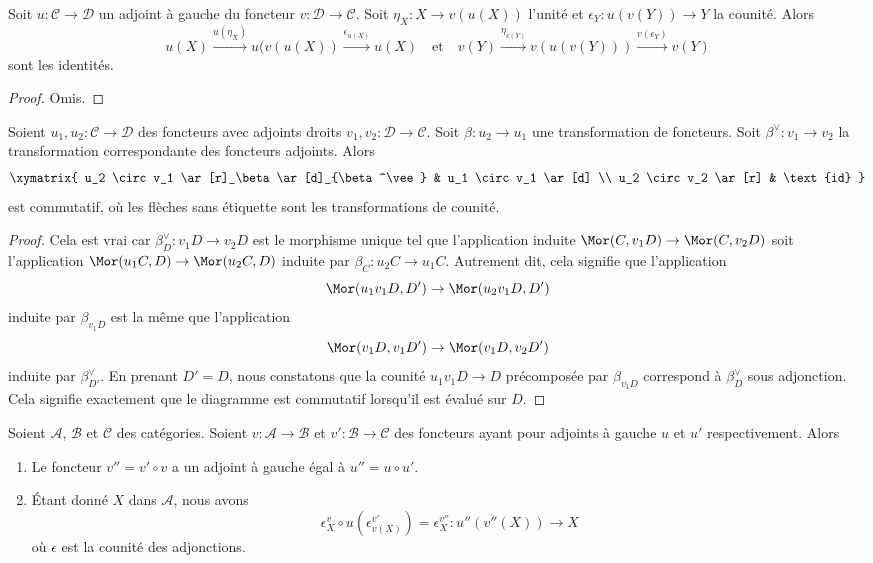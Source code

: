\begin{lemma}
\label{lemma-unit-counit-relations}
Soit $u : \mathcal{C} \to \mathcal{D}$ un adjoint à gauche du foncteur $v : \mathcal{D} \to \mathcal{C}$. Soit $\eta_X : X \to v(u(X))$ l'unité et
$\epsilon_Y : u(v(Y)) \to Y$ la counité. Alors
$$
u(X) \xrightarrow{u(\eta_X)} u(v(u(X))
\xrightarrow{\epsilon_{u(X)}} u(X)
\quad\text{et}\quad
v(Y) \xrightarrow{\eta_{v(Y)}} v(u(v(Y))) \xrightarrow{v(\epsilon_Y)}
v(Y)
$$
sont les identités.
\end{lemma}

\begin{proof}
Omis.
\end{proof}



\begin{lemma}
\label{lemma-transformation-between-functors-and-adjoints}
Soient $u_1, u_2 : \mathcal{C} \to \mathcal{D}$ des foncteurs avec adjoints
droits $v_1, v_2 : \mathcal{D} \to \mathcal{C}$. Soit $\beta : u_2 \to u_1$
une transformation de foncteurs. Soit $\beta^\vee : v_1 \to v_2$ la
transformation correspondante des foncteurs adjoints. Alors
$$
\xymatrix{
u_2 \circ v_1 \ar[r]_\beta \ar[d]_{\beta^\vee} &
u_1 \circ v_1 \ar[d] \\
u_2 \circ v_2 \ar[r] & \text{id}
}
$$
est commutatif, où les flèches sans étiquette sont les transformations de
counité.
\end{lemma}

\begin{proof}
Cela est vrai car $\beta^\vee_D : v_1D \to v_2D$ est le morphisme unique tel
que l'application induite $\Mor(C, v_1D) \to \Mor(C, v_2D)$ soit
l'application $\Mor(u_1C, D) \to \Mor(u_2C, D)$ induite par $\beta_C : u_2C \to u_1C$. Autrement dit, cela signifie que l'application
$$
\Mor(u_1 v_1 D, D') \to \Mor(u_2 v_1 D, D')
$$
induite par $\beta_{v_1 D}$ est la même que l'application
$$
\Mor(v_1 D, v_1 D') \to \Mor(v_1 D, v_2 D')
$$
induite par $\beta^\vee_{D'}$. En prenant $D' = D$, nous constatons que la counité
$u_1 v_1 D \to D$ précomposée par $\beta_{v_1D}$ correspond à $\beta^\vee_D$
sous adjonction. Cela signifie exactement que le diagramme est commutatif
lorsqu'il est évalué sur $D$.
\end{proof}

\begin{lemma}
\label{lemma-compose-counits}
Soient $\mathcal{A}$, $\mathcal{B}$ et $\mathcal{C}$ des catégories. Soient $v : \mathcal{A} \to \mathcal{B}$ et $v' : \mathcal{B} \to \mathcal{C}$ des
foncteurs ayant pour adjoints à gauche $u$ et $u'$ respectivement. Alors
\begin{enumerate}
\item Le foncteur $v'' = v' \circ v$ a un adjoint à gauche égal à $u'' = u \circ u'$.
\item Étant donné $X$ dans $\mathcal{A}$, nous avons
\begin{equation}
\label{equation-compose-counits}
\epsilon_X^v \circ u(\epsilon^{v'}_{v(X)}) = \epsilon^{v''}_X :
u''(v''(X)) \to X
\end{equation}
où $\epsilon$ est la counité des adjonctions.
\end{enumerate}
\end{lemma}

